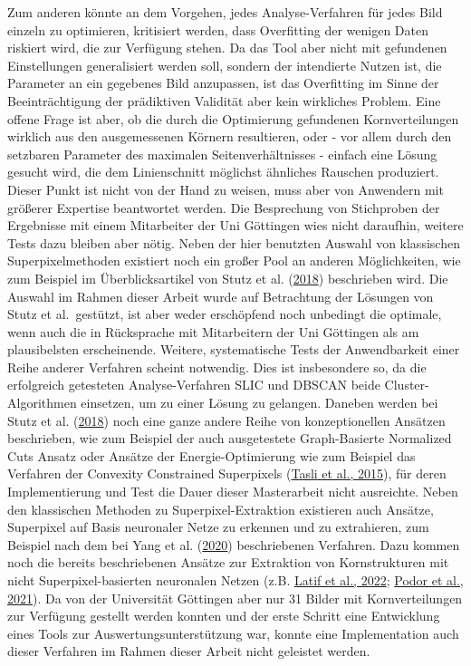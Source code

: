 \documentclass[
  12pt,
  openany]{book}
\begin{document}
Zum anderen könnte an dem Vorgehen, jedes Analyse-Verfahren für jedes Bild einzeln zu optimieren, kritisiert werden, dass Overfitting der wenigen Daten riskiert wird, die zur Verfügung stehen. Da das Tool aber nicht mit gefundenen Einstellungen generalisiert werden soll, sondern der intendierte Nutzen ist, die Parameter an ein gegebenes Bild anzupassen, ist das Overfitting im Sinne der Beeinträchtigung der prädiktiven Validität aber kein wirkliches Problem. Eine offene Frage ist aber, ob die durch die Optimierung gefundenen Kornverteilungen wirklich aus den ausgemessenen Körnern resultieren, oder - vor allem durch den setzbaren Parameter des maximalen Seitenverhältnisses - einfach eine Lösung gesucht wird, die dem Linienschnitt möglichst ähnliches Rauschen produziert. Dieser Punkt ist nicht von der Hand zu weisen, muss aber von Anwendern mit größerer Expertise beantwortet werden. Die Besprechung von Stichproben der Ergebnisse mit einem Mitarbeiter der Uni Göttingen wies nicht daraufhin, weitere Tests dazu bleiben aber nötig.
Neben der hier benutzten Auswahl von klassischen Superpixelmethoden existiert noch ein großer Pool an anderen Möglichkeiten, wie zum Beispiel im Überblicksartikel von Stutz et al. (\protect\hyperlink{ref-stutzSuperpixelsEvaluationStateoftheart2018}{2018}) beschrieben wird. Die Auswahl im Rahmen dieser Arbeit wurde auf Betrachtung der Lösungen von Stutz et al.~gestützt, ist aber weder erschöpfend noch unbedingt die optimale, wenn auch die in Rücksprache mit Mitarbeitern der Uni Göttingen als am plausibelsten erscheinende. Weitere, systematische Tests der Anwendbarkeit einer Reihe anderer Verfahren scheint notwendig. Dies ist insbesondere so, da die erfolgreich getesteten Analyse-Verfahren SLIC und DBSCAN beide Cluster-Algorithmen einsetzen, um zu einer Lösung zu gelangen. Daneben werden bei Stutz et al. (\protect\hyperlink{ref-stutzSuperpixelsEvaluationStateoftheart2018}{2018}) noch eine ganze andere Reihe von konzeptionellen Ansätzen beschrieben, wie zum Beispiel der auch ausgetestete Graph-Basierte Normalized Cuts Ansatz oder Ansätze der Energie-Optimierung wie zum Beispiel das Verfahren der Convexity Constrained Superpixels (\protect\hyperlink{ref-tasliConvexityConstrainedEfficient2015}{Tasli et al., 2015}), für deren Implementierung und Test die Dauer dieser Masterarbeit nicht ausreichte.
Neben den klassischen Methoden zu Superpixel-Extraktion existieren auch Ansätze, Superpixel auf Basis neuronaler Netze zu erkennen und zu extrahieren, zum Beispiel nach dem bei Yang et al. (\protect\hyperlink{ref-yangSuperpixelSegmentationFully2020}{2020}) beschriebenen Verfahren. Dazu kommen noch die bereits beschriebenen Ansätze zur Extraktion von Kornstrukturen mit nicht Superpixel-basierten neuronalen Netzen (z.B. \protect\hyperlink{ref-latifDeepLearningBasedAutomaticMineral2022}{Latif et al., 2022}; \protect\hyperlink{ref-podorSEraMicSemiautomaticMethod2021}{Podor et al., 2021}). Da von der Universität Göttingen aber nur 31 Bilder mit Kornverteilungen zur Verfügung gestellt werden konnten und der erste Schritt eine Entwicklung eines Tools zur Auswertungsunterstützung war, konnte eine Implementation auch dieser Verfahren im Rahmen dieser Arbeit nicht geleistet werden.
\end{document}
